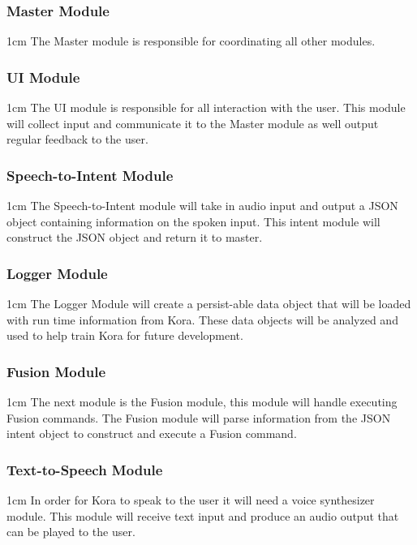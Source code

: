 \documentclass[onecolumn, draftclsnofoot,10pt, compsoc]{IEEEtran}
\def \botname{Kora\xspace}
\newenvironment{indentItem}[1][1cm]{\begin{adjustwidth}{#1}{}}{\end{adjustwidth}}
\begin{document}
		\subsubsection{Master Module}
			\begin{indentItem}
				The Master module is responsible for coordinating all other modules.
			\end{indentItem}
		\subsubsection{UI Module}
			\begin{indentItem}
				The UI module is responsible for all interaction with the user.
				This module will collect input and communicate it to the Master module as well output regular feedback to the user.
			\end{indentItem}
		\subsubsection{Speech-to-Intent Module}
			\begin{indentItem}
				The Speech-to-Intent module will take in audio input and output a JSON object containing information on the spoken input.
				This intent module will construct the JSON object and return it to master.
			\end{indentItem}
		\subsubsection{Logger Module}
			\begin{indentItem}
				The Logger Module will create a persist-able data object that will be loaded with run time information from \botname.
				These data objects will be analyzed and used to help train \botname for future development.
			\end{indentItem}
		\subsubsection{Fusion Module}
			\begin{indentItem}
				The next module is the Fusion module, this module will handle executing Fusion commands.
				The Fusion module will parse information from the JSON intent object to construct and execute a Fusion command.
			\end{indentItem}
		\subsubsection{Text-to-Speech Module}
			\begin{indentItem}
				In order for \botname to speak to the user it will need a voice synthesizer module.
				This module will receive text input and produce an audio output that can be played to the user.
			\end{indentItem}		
\end{document}
